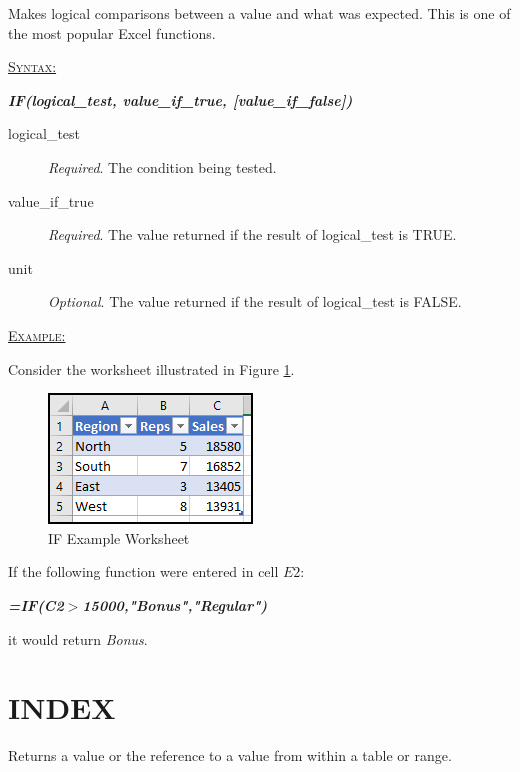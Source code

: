 Makes logical comparisons between a value and what was expected. This is one of the most popular Excel functions.

\begin{addmargin}[1cm]{0cm}

	\medskip
	\underline{\textsc{Syntax:}}
	\medskip

	{\color{Syntax}
		\noindent\textbf{\textit{IF(logical\_test, value\_if\_true, [value\_if\_false])}}
	}
	
	\begin{description}
		\item[logical\_test] \textit{Required}. The condition being tested.
		\item[value\_if\_true] \textit{Required}. The value returned if the result of logical\_test is TRUE.
		\item[unit] \textit{Optional}. The value returned if the result of logical\_test is FALSE. 
	\end{description}

	\medskip
	\noindent\underline{\textsc{Example:}}
	\medskip
	
	\noindent Consider the worksheet illustrated in Figure \ref{apa:if}.
	
	\begin{figure}[H]
		\centering
		\includegraphics[width=\maxwidth{.45\linewidth}]{gfx/apa_fig01}
		\caption{IF Example Worksheet}
		\label{apa:if}
	\end{figure}
	
	\noindent If the following function were entered in cell $ E2 $:
	
	{\color{Syntax}
		\textit{\textbf{=IF(C2$ > $15000,"Bonus","Regular")}}
	}
	
	\noindent it would return \textit{Bonus}.

\end{addmargin}

\section{INDEX}

Returns a value or the reference to a value from within a table or range.

